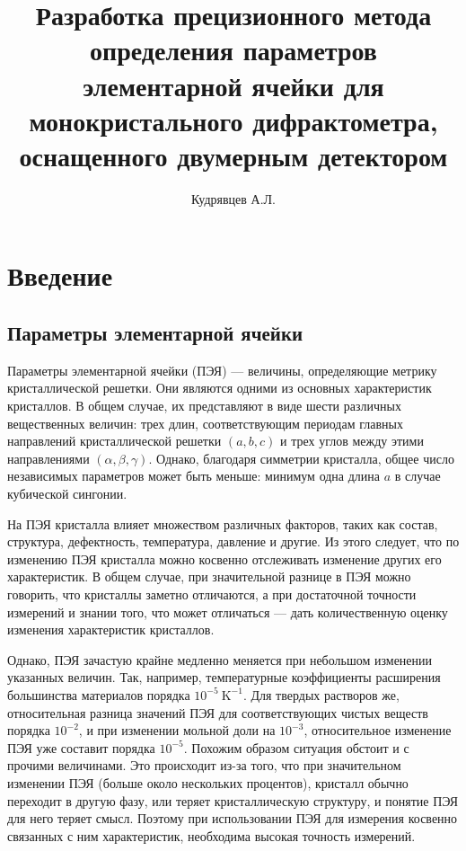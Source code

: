 \documentclass[a4paper,14pt]{extarticle}
\author{Кудрявцев А.Л.}
\title{Разработка прецизионного метода определения параметров элементарной ячейки для монокристального дифрактометра, оснащенного двумерным детектором}
\newcommand{\unit}[1]{ \ \text{#1}}
\begin{document}
\maketitle
\newpage
\tableofcontents
\newpage
\section{Введение}

\subsection{Параметры элементарной ячейки}

Параметры элементарной ячейки (ПЭЯ) --- величины, определяющие метрику кристаллической решетки.
Они являются одними из основных характеристик кристаллов.
В общем случае, их представляют в виде шести различных вещественных величин: трех длин, соответствующим периодам главных направлений кристаллической решетки $(a, b, c)$ и трех углов между этими направлениями $(\alpha, \beta, \gamma)$.
Однако, благодаря симметрии кристалла, общее число независимых параметров может быть меньше: минимум одна длина $a$ в случае кубической сингонии.

На ПЭЯ кристалла влияет множеством различных факторов, таких как состав, структура, дефектность, температура, давление и другие.
Из этого следует, что по изменению ПЭЯ кристалла можно косвенно отслеживать изменение других его характеристик.
В общем случае, при значительной разнице в ПЭЯ можно говорить, что кристаллы заметно отличаются, а при достаточной точности измерений и знании того, что может отличаться --- дать количественную оценку изменения характеристик кристаллов.

Однако, ПЭЯ зачастую крайне медленно меняется при небольшом изменении указанных величин.
Так, например, температурные коэффициенты расширения большинства материалов порядка $10^{-5} \unit{K}^{-1}$.
Для твердых растворов же, относительная разница значений ПЭЯ для соответствующих чистых веществ порядка $10^{-2}$, и при изменении мольной доли на $10^{-3}$, относительное изменение ПЭЯ уже составит порядка $10^{-5}$.
Похожим образом ситуация обстоит и с прочими величинами.
Это происходит из-за того, что при значительном изменении  ПЭЯ (больше около нескольких процентов), кристалл обычно переходит в другую фазу, или теряет кристаллическую структуру, и понятие ПЭЯ для него теряет смысл.
Поэтому при использовании ПЭЯ для измерения косвенно связанных с ним характеристик, необходима высокая точность измерений.
\end{document}

